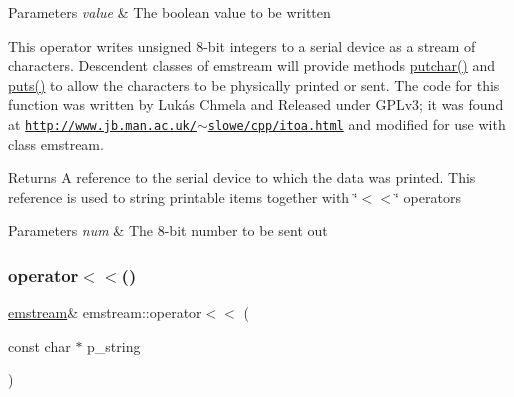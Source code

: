 \begin{DoxyParams}{Parameters}
{\em value} & The boolean value to be written\\
\hline
\end{DoxyParams}
This operator writes unsigned 8-\/bit integers to a serial device as a stream of characters. Descendent classes of {\ttfamily emstream} will provide methods {\ttfamily \mbox{\hyperlink{classemstream_aa4dffc9aa58f601cc4153b4cbe65d757}{putchar()}}} and {\ttfamily \mbox{\hyperlink{classemstream_a1ad530cbebe6c54640c1db8c1b9afda2}{puts()}}} to allow the characters to be physically printed or sent. The code for this function was written by Lukás Chmela and Released under G\+P\+Lv3; it was found at \href{http://www.jb.man.ac.uk/~slowe/cpp/itoa.html}{\tt http\+://www.\+jb.\+man.\+ac.\+uk/$\sim$slowe/cpp/itoa.\+html} and modified for use with class {\ttfamily emstream}. \begin{DoxyReturn}{Returns}
A reference to the serial device to which the data was printed. This reference is used to string printable items together with \char`\"{}$<$$<$\char`\"{} operators 
\end{DoxyReturn}

\begin{DoxyParams}{Parameters}
{\em num} & The 8-\/bit number to be sent out \\
\hline
\end{DoxyParams}
\mbox{\label{classemstream_ac570021b41b465fd0f98257a17316e7b}} 
\subsubsection{\texorpdfstring{operator$<$$<$()}{operator<<()}\hspace{0.1cm}{\footnotesize\ttfamily [2/14]}}
{\footnotesize\ttfamily \mbox{\hyperlink{classemstream}{emstream}}\& emstream\+::operator$<$$<$ (\begin{DoxyParamCaption}\item[{const char $\ast$}]{p\+\_\+string }\end{DoxyParamCaption})\hspace{0.3cm}{\ttfamily [inline]}}

